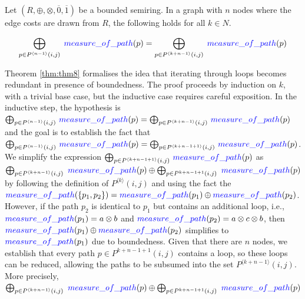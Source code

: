 \documentclass[a4paper,UKenglish,cleveref, autoref, thm-restate, anonymous]{lipics-v2021}
\begin{document}
 
\begin{theorem}\label{thm:thm8}
Let \((R, \oplus, \otimes, \overline{0}, \overline{1})\) be a bounded 
semiring. In a graph with $n$ nodes where the edge costs are drawn from $R$, the following holds 
for all $k \in N$.
\end{theorem}
\[  
\bigoplus_{p \in P^{\langle n - 1 \rangle}(i, j)}\;\textcolor{blue}{measure\_of\_path}(p)  =  
\bigoplus_{p \in P^{\langle k + n - 1 \rangle}(i, j)}\;\textcolor{blue}{measure\_of\_path}(p)
\]   





Theorem \ref{thm:thm8} formalises the idea that iterating through loops becomes redundant in presence of boundedness. 
The proof proceeds by induction on $k$, with a trivial base case, but the inductive case requires careful exposition. 
In the inductive step, the hypothesis is 
$ \bigoplus_{p \in P^{\langle n - 1 \rangle}(i, j)} \, \textcolor{blue}{measure\_of\_path}(p) = 
\bigoplus_{p \in P^{\langle k + n - 1 \rangle}(i, j)} \, \textcolor{blue}{measure\_of\_path}(p)$ and the goal is to establish the fact that $ \bigoplus_{p \in P^{\langle n - 1 \rangle}(i, j)} \, \textcolor{blue}{measure\_of\_path}(p) =  
   \bigoplus_{p \in P^{\langle k + n - 1 + 1 \rangle}(i, j)} \, \textcolor{blue}{measure\_of\_path}(p)$. 
We simplify the expression $\bigoplus_{p \in P^{\langle k + n - 1 + 1 \rangle}(i, j)} \, \textcolor{blue}{measure\_of\_path}(p)$ as 
$\bigoplus_{p \in P^{\langle k + n - 1 \rangle}(i, j)} \ \textcolor{blue}{measure\_of\_path}(p) \oplus \bigoplus_{p \in P^{k + n - 1 + 1}(i, j)} \ \textcolor{blue}{measure\_of\_path}(p)$ by following 
the definition of  $P^{\langle k \rangle}(i, j)$  and using the fact the $\textcolor{blue}{measure\_of\_path}(\{p_{1}, p_{2} \}) = 
\textcolor{blue}{measure\_of\_path}(p_{1}) \oplus \textcolor{blue}{measure\_of\_path} (p_{2})$. However, if the path  $p_{2}$ is identical to  $p_{1}$ but contains an additional loop, i.e.,
$\textcolor{blue}{measure\_of\_path}(p_{1}) = a \otimes b$ and $\textcolor{blue}{measure\_of\_path}(p_{2}) = a \otimes c \otimes b$, 
then $\textcolor{blue}{measure\_of\_path}(p_{1}) \oplus \textcolor{blue}{measure\_of\_path}(p_{2})$ simplifies to $\textcolor{blue}{measure\_of\_path}(p_{1})$ due to boundedness. 
Given that there are $n$ nodes, we establish that every path $p \in P^{k + n - 1 + 1}(i, j)$ contains a loop, so 
these loops can be reduced, allowing the paths to be subsumed into the set $P^{\langle k + n - 1 \rangle}(i, j)$.
More precisely, $\bigoplus_{p \in P^{\langle k + n - 1 \rangle}(i, j)} \ \textcolor{blue}{measure\_of\_path}(p) \oplus \bigoplus_{p \in P^{ k + n - 1 + 1}(i, j)} \ \textcolor{blue}{measure\_of\_path}(p)$
\end{document}

